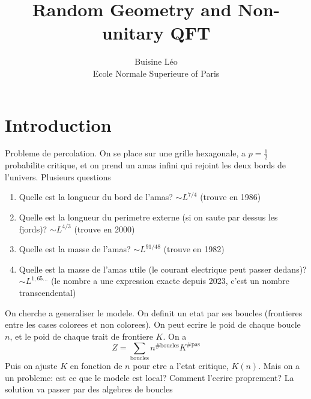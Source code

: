 \documentclass[a4paper]{book}
\theoremstyle{definition}
\theoremstyle{remark}
\begin{document}
\title{Random Geometry and Non-unitary QFT}
\author{Buisine Léo\\Ecole Normale Superieure of Paris}
\maketitle

\tableofcontents

\chapter{Introduction}
Probleme de percolation. On se place sur une grille hexagonale, a $p=\frac{1}{2}$ probabilite critique, et on prend un amas infini qui rejoint les deux bords de l'univers. Plusieurs questions 
\begin{enumerate}
    \item Quelle est la longueur du bord de l'amas? $\sim L^{7/4}$ (trouve en 1986)
    \item Quelle est la longueur du perimetre externe (si on saute par dessus les fjords)? $\sim L^{4/3}$ (trouve en 2000)
    \item Quelle est la masse de l'amas? $\sim L^{91/48}$ (trouve en 1982)
    \item Quelle est la masse de l'amas utile (le courant electrique peut passer dedans)? $\sim L ^{1,65...}$ (le nombre a une expression exacte depuis 2023, c'est un nombre transcendental)
\end{enumerate}

On cherche a generaliser le modele. On definit un etat par ses boucles (frontieres entre les cases colorees et non colorees). On peut ecrire le poid de chaque boucle $n$, et le poid de chaque trait de frontiere $K$. On a 
\begin{equation}
    Z = \sum_{\text{boucles}} n^{\# \text{boucles}} K^{\#\text{pas}}
\end{equation}
Puis on ajuste $K$ en fonction de $n$ pour etre a l'etat critique, $K(n)$. Mais on a un probleme: est ce que le modele est local? Comment l'ecrire proprement? La solution va passer par des algebres de boucles \par \medskip 
\end{document}
